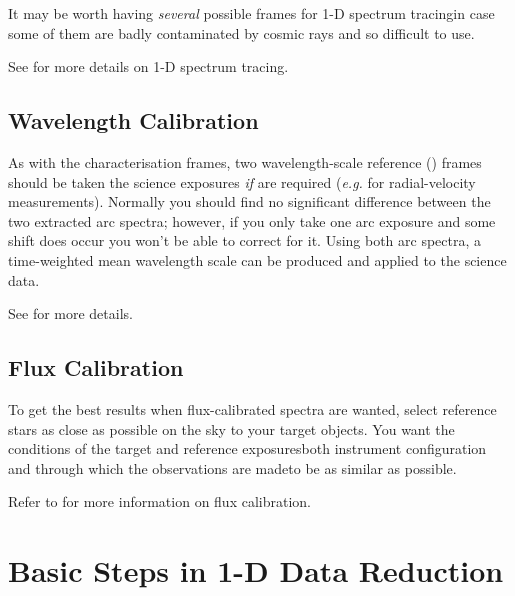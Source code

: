 It may be worth having {\em several} possible frames for
1-D spectrum tracing\scspec{---}{ - }in case some of them are badly
contaminated by cosmic rays and so difficult to use.

See 
for more details on 1-D spectrum tracing.


\subsection{Wavelength Calibration}

As with the  characterisation frames, two
wavelength-scale reference () frames should be
taken  the science exposures
{\em if}  are required
({\it{e.g.}} for radial-velocity measurements)\@.
Normally you should find no significant difference between the two
extracted arc spectra; however, if you only take one arc exposure and
some shift does occur you won't be able to correct for it.
Using both arc spectra, a time-weighted mean wavelength scale can be
produced and applied to the science data.

See \scspec{\S\ref{wavelength_calibration}}
{}
for more details.

\subsection{Flux Calibration}

To get the best results when flux-calibrated spectra are wanted, select
reference stars as close as possible on the sky to your target objects.
You want the conditions of the target and reference
exposures\scspec{---}{ - }both instrument configuration and
through which the observations are made\scspec{---}{ - }to be as
similar as possible.

Refer to 
for more information on flux calibration.


\section{Basic Steps in 1-D Data Reduction}

